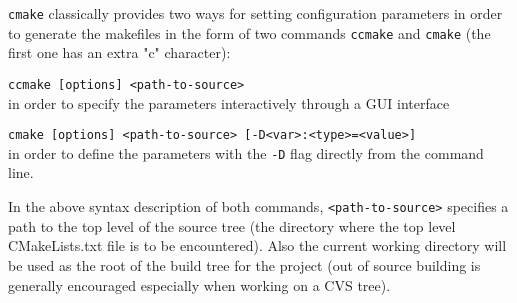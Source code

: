 \verb+cmake+ classically provides two ways for setting configuration
parameters in order to generate the makefiles in the form of two
commands \verb+ccmake+ and \verb+cmake+ (the first one has an extra
"c" character):
\begin{description}
\item{\verb+ccmake [options] <path-to-source>+}\\ in order to specify
  the parameters interactively through a GUI interface
\item{\verb+cmake [options] <path-to-source> [-D<var>:<type>=<value>]+}\\ in
  order to define the parameters with the \verb+-D+ flag directly from
  the command line.
\end{description}
In the above syntax description of both commands, {\verb+<path-to-source>+}
specifies a path to the top level of the source tree (\ie the directory where
the top level CMakeLists.txt file is to be encountered). Also the current
working directory will be used as the root of the build tree for the project
(out of source building is generally encouraged especially when working on a
CVS tree).

